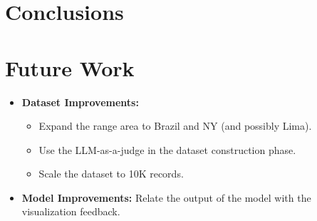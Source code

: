 
\section{Conclusions}

\section{Future Work}

\begin{itemize}
    \item \textbf{Dataset Improvements:} 
    \begin{itemize}
        \item Expand the range area to Brazil and NY (and possibly Lima). 
        \item Use the LLM-as-a-judge in the dataset construction phase.
        \item Scale the dataset to 10K records.
    \end{itemize}
    \item \textbf{Model Improvements:} Relate the output of the model with the visualization feedback.
\end{itemize}
